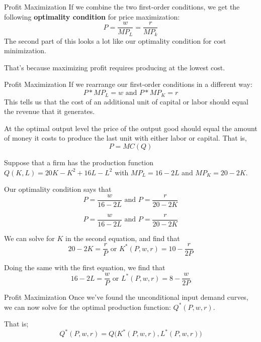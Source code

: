 \documentclass[11pt,t]{beamer}
\begin{document}
\begin{frame}{Profit Maximization}
  If we combine the two first-order conditions, we get the following \textbf{optimality condition} for price maximization:
  $$
    P = \frac{w}{MP_L} = \frac{r}{MP_k}
  $$
  The second part of this looks a lot like our optimality condition for cost minimization.

  \bigskip
  That's because maximizing profit requires producing at the lowest cost.
\end{frame}

\begin{frame}{Profit Maximization}
  If we rearrange our first-order conditions in a different way:
  $$
    P * MP_L = w \text{ and } P * MP_K = r
  $$
  This tells us that the cost of an additional unit of capital or labor should equal the revenue that it generates.

  \bigskip
  At the optimal output level the price of the output good should equal the amount of money it costs to produce the last unit with either labor or capital. That is,
  $$
    P = MC(Q)
  $$
\end{frame}


\begin{frame}{}
  Suppose that a firm has the production function $Q(K,L) = 20K-K^2 + 16L-L^2$ with $MP_L = 16-2L$ and $MP_K = 20-2K$.

  \bigskip
  Our optimality condition says that
  $$
    P = \frac{w}{16 - 2L} \text{ and } P = \frac{r}{20 - 2K}
  $$

\end{frame}

\begin{frame}{}
  $$
    P = \frac{w}{16 - 2L} \text{ and } P = \frac{r}{20 - 2K}
  $$

  \bigskip
  We can solve for $K$ in the second equation, and find that
  $$
    20-2K=\frac{r}{P} \text{ or }  K^*(P,w,r) = 10- \frac{r}{2P}
  $$

  \pause
  Doing the same with the first equation, we find that
  $$
    16-2L = \frac{w}{P} \text{ or } L^*(P,w,r) = 8 - \frac{w}{2P}
  $$
\end{frame}

\begin{frame}{Profit Maximization}
  Once we've found the unconditional input demand curves, we can now solve for the optimal production function: $Q^*(P,w,r)$.

  That is;
  $$
    Q^*(P,w,r) = Q\big( K^*(P,w,r), L^*(P,w,r) \big)
  $$
\end{frame}
\end{document}
